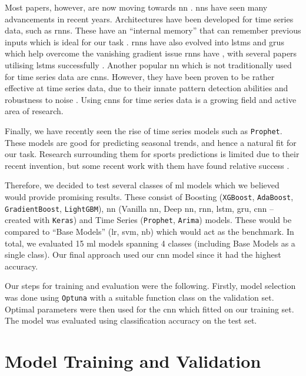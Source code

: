 \documentclass{article}
\newcommand{\sw}[1]{\texttt{#1}}
\begin{document}
Most papers, however, are now moving towards \gls{nn} \cite{horvat2020use}. \gls{nn}s have seen many advancements in recent years. Architectures have been developed for time series data, such as \gls{rnn}s. These have an “internal memory” that can remember previous inputs which is ideal for our task \cite{dongesbuiltinRNN}. \gls{rnn}s have also evolved into \gls{lstm}s and \gls{gru}s which help overcome the vanishing gradient issue \gls{rnn}s have \cite{dongesbuiltinRNN}, with several papers utilising \gls{lstm}s successfully \cite{goddijn2018surebet, jain2021soccer}. Another popular \gls{nn} which is not traditionally used for time series data are \gls{cnn}s. However, they have been proven to be rather effective at time series data, due to their innate pattern detection abilities and robustness to noise \cite{brownleemediumconvolutional}. Using \gls{cnn}s for time series data is a growing field and active area of research. 

Finally, we have recently seen the rise of time series models such as \sw{Prophet}. These models are good for predicting seasonal trends, and hence a natural fit for our task. Research surrounding them for sports predictions is limited due to their recent invention, but some recent work with them have found relative success \cite{nandakumarmediumforecasting}. 

Therefore, we decided to test several classes of \gls{ml} models which we believed would provide promising results. These consist of Boosting (\sw{XGBoost}, \sw{AdaBoost}, \sw{GradientBoost}, \sw{LightGBM}), \gls{nn} (Vanilla \gls{nn}, Deep \gls{nn}, \gls{rnn}, \gls{lstm}, \gls{gru}, \gls{cnn} – created with \sw{Keras}) and Time Series (\sw{Prophet}, \sw{Arima}) models. These would be compared to “Base Models” (\gls{lr}, \gls{svm}, \gls{nb}) which would act as the benchmark. In total, we evaluated 15 \gls{ml} models spanning 4 classes (including Base Models as a single class). Our final approach used our \gls{cnn} model since it had the highest accuracy.

Our steps for training and evaluation were the following. Firstly, model selection was done using \sw{Optuna} with a suitable function class on the validation set. Optimal parameters were then used for the \gls{cnn} which fitted on our training set. The model was evaluated using classification accuracy on the test set. 

\section{Model Training and Validation}
\label{model}
\end{document}

